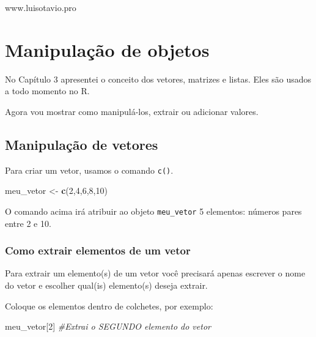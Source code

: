 \documentclass[
]{book}
\newenvironment{Shaded}{\begin{snugshade}}{\end{snugshade}}
\newcommand{\CommentTok}[1]{\textcolor[rgb]{0.56,0.35,0.01}{\textit{#1}}}
\newcommand{\DecValTok}[1]{\textcolor[rgb]{0.00,0.00,0.81}{#1}}
\newcommand{\KeywordTok}[1]{\textcolor[rgb]{0.13,0.29,0.53}{\textbf{#1}}}
\newcommand{\NormalTok}[1]{#1}
\newcommand{\StringTok}[1]{\textcolor[rgb]{0.31,0.60,0.02}{#1}}
\begin{document}
www.luisotavio.pro

\hypertarget{manipulauxe7uxe3o-de-objetos}{%
\chapter{Manipulação de objetos}\label{manipulauxe7uxe3o-de-objetos}}

No Capítulo 3 apresentei o conceito dos vetores, matrizes e listas. Eles
são usados a todo momento no R.

Agora vou mostrar como manipulá-los, extrair ou adicionar valores.

\hypertarget{manipulauxe7uxe3o-de-vetores}{%
\section{Manipulação de vetores}\label{manipulauxe7uxe3o-de-vetores}}

Para criar um vetor, usamos o comando \texttt{c()}.

\begin{Shaded}
\begin{Highlighting}[]
\NormalTok{meu_vetor <-}\StringTok{ }\KeywordTok{c}\NormalTok{(}\DecValTok{2}\NormalTok{,}\DecValTok{4}\NormalTok{,}\DecValTok{6}\NormalTok{,}\DecValTok{8}\NormalTok{,}\DecValTok{10}\NormalTok{) }
\end{Highlighting}
\end{Shaded}

O comando acima irá atribuir ao objeto \texttt{meu\_vetor} 5 elementos:
números pares entre 2 e 10.

\hypertarget{como-extrair-elementos-de-um-vetor}{%
\subsection{Como extrair elementos de um
vetor}\label{como-extrair-elementos-de-um-vetor}}

Para extrair um elemento(s) de um vetor você precisará apenas escrever o
nome do vetor e escolher qual(is) elemento(s) deseja extrair.

Coloque os elementos dentro de colchetes, por exemplo:

\begin{Shaded}
\begin{Highlighting}[]
\NormalTok{meu_vetor[}\DecValTok{2}\NormalTok{]  }\CommentTok{#Extrai o SEGUNDO elemento do vetor}
\end{Highlighting}
\end{Shaded}
\end{document}
